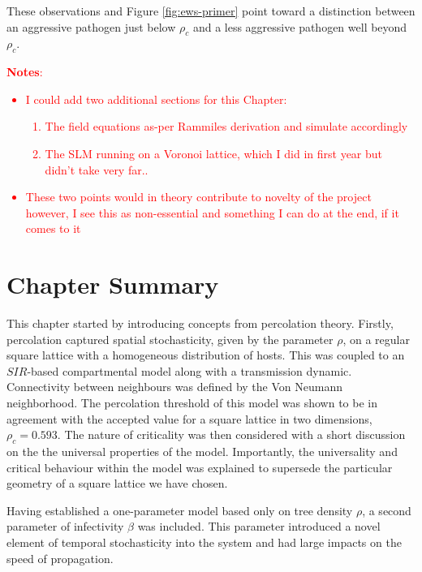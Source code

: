 These observations and Figure \ref{fig:ews-primer} point toward a distinction between an %
aggressive pathogen just below $\rho_c$ and a less aggressive pathogen well beyond $\rho_c$. %
 
 \textcolor{red}{
 \textbf{Notes}:
 \begin{itemize}
     \item I could add two additional sections for this Chapter:
     \begin{enumerate}
         \item The field equations as-per Rammiles derivation and simulate accordingly
         \item The SLM running on a Voronoi lattice, which I did in first year but didn't take very far..
     \end{enumerate}
    \item These two points would in theory contribute to novelty of the project however, I see this as non-essential and something I can do at the end, if it comes to it
 \end{itemize}}
 
\section{Chapter Summary}

This chapter started by introducing concepts from percolation theory. %
Firstly, percolation captured spatial stochasticity, given by the parameter $\rho$, on a regular square %
lattice with a homogeneous distribution of hosts. %
This was coupled to an $SIR$-based compartmental model along with a transmission dynamic. %
Connectivity between neighbours was defined by the Von Neumann neighborhood. %
The percolation threshold of this model was shown to be in agreement with the accepted value %
for a square lattice in two dimensions, $\rho_c = 0.593$. The nature of %
criticality was then considered with a short discussion on the  the universal properties of the model. %
Importantly, the universality and critical behaviour within the model was explained to supersede %
the particular geometry of a square lattice we have chosen. %

Having established a one-parameter model based only on tree density $\rho$, a second parameter %
of infectivity $\beta$ was included. %
This parameter introduced a novel element of temporal stochasticity into the system %
and had large impacts on the speed of propagation. %

